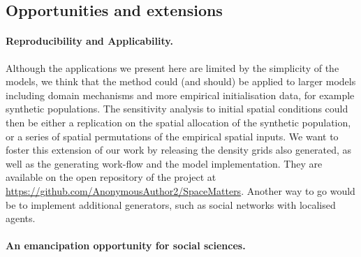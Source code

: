 \documentclass[3p,times,procedia]{elsarticle}
\begin{document}

\subsection{Opportunities and extensions}


\paragraph{Reproducibility and Applicability.} 

Although the applications we present here are limited by the simplicity of the models, we think that the method could (and should) be applied to larger models including domain mechanisms and more empirical initialisation data, for example synthetic populations. The sensitivity analysis to initial spatial conditions could then be either a replication on the spatial allocation of the synthetic population, or a series of spatial permutations of the empirical spatial inputs.
We want to foster this extension of our work by releasing the density grids also generated, as well as the generating work-flow and the model implementation. They are available on the open repository of the project at \url{https://github.com/AnonymousAuthor2/SpaceMatters}. Another way to go would be to implement additional generators, such as social networks \citep{alizadeh2016generating} with localised agents. 


\paragraph{An emancipation opportunity for social sciences.}

\end{document}
